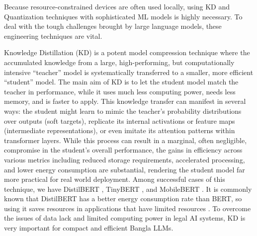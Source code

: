 Because resource-constrained devices are often used locally, using KD and Quantization techniques with sophisticated ML models is highly necessary. To deal with the tough challenges brought by large language models, these engineering techniques are vital.

Knowledge Distillation (KD) is a potent model compression technique where the accumulated knowledge from a large, high-performing, but computationally intensive ``teacher'' model is systematically transferred to a smaller, more efficient ``student'' model. The main aim of KD is to let the student model match the teacher in performance, while it uses much less computing power, needs less memory, and is faster to apply. This knowledge transfer can manifest in several ways: the student might learn to mimic the teacher's probability distributions over outputs (soft targets), replicate its internal activations or feature maps (intermediate representations), or even imitate its attention patterns within transformer layers. While this process can result in a marginal, often negligible, compromise in the student's overall performance, the gains in efficiency across various metrics including reduced storage requirements, accelerated processing, and lower energy consumption are substantial, rendering the student model far more practical for real world deployment. Among successful cases of this technique, we have DistilBERT \cite{sanh2020distilbertdistilledversionbert}, TinyBERT \cite{jiao2020tinybertdistillingbertnatural}, and MobileBERT \cite{sun2020mobilebertcompacttaskagnosticbert}. It is commonly known that DistilBERT has a better energy consumption rate than BERT, so using it saves resources in applications that have limited resources \cite{10.1145/3644815.3644966}. To overcome the issues of data lack and limited computing power in legal AI systems, KD is very important for compact and efficient Bangla LLMs.

